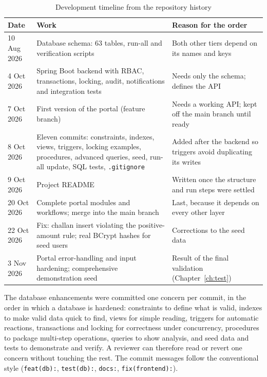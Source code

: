 \begin{table}[H]
\centering\small
\caption{Development timeline from the repository history}\label{tab:timeline}
\begin{tabularx}{\linewidth}{@{}p{2.3cm}p{4.4cm}X@{}}
\toprule \textbf{Date} & \textbf{Work} & \textbf{Reason for the order}\\ \midrule
10 Aug 2026 & Database schema: 63 tables, run-all and verification scripts & Both other tiers depend on its names and keys\\
4 Oct 2026 & Spring Boot backend with RBAC, transactions, locking, audit, notifications and integration tests & Needs only the schema; defines the API\\
7 Oct 2026 & First version of the portal (feature branch) & Needs a working API; kept off the main branch until ready\\
8 Oct 2026 & Eleven commits: constraints, indexes, views, triggers, locking examples, procedures, advanced queries, seed, run-all update, SQL tests, \texttt{.gitignore} & Added after the backend so triggers avoid duplicating its writes\\
9 Oct 2026 & Project README & Written once the structure and run steps were settled\\
20 Oct 2026 & Complete portal modules and workflows; merge into the main branch & Last, because it depends on every other layer\\
22 Oct 2026 & Fix: challan insert violating the positive-amount rule; real BCrypt hashes for seed users & Corrections to the seed data\\
3 Nov 2026 & Portal error-handling and input hardening; comprehensive demonstration seed & Result of the final validation (Chapter~\ref{ch:test})\\
\bottomrule
\end{tabularx}
\end{table}
The database enhancements were committed one concern per commit, in the order in which a
database is hardened: constraints to define what is valid, indexes to make valid data
quick to find, views for simple reading, triggers for automatic reactions, transactions
and locking for correctness under concurrency, procedures to package multi-step
operations, queries to show analysis, and seed data and tests to demonstrate and verify. A
reviewer can therefore read or revert one concern without touching the rest. The commit
messages follow the conventional style (\texttt{feat(db):}, \texttt{test(db):},
\texttt{docs:}, \texttt{fix(frontend):}).

